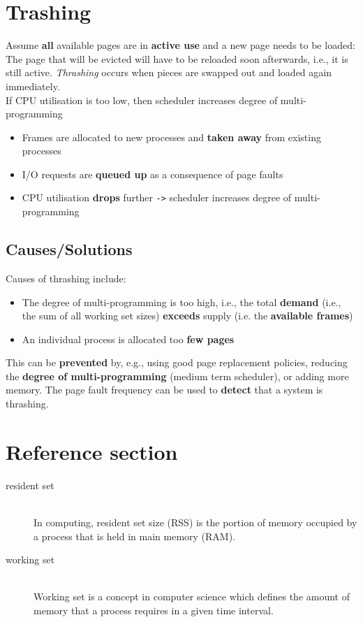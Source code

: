 \documentclass{article}
\begin{document}
\section{Trashing}
\begin{flushleft}
Assume \textbf{all} available pages are in \textbf{active use} and a new page needs to be loaded: The page that will be evicted will have to be reloaded soon afterwards, i.e., it is still active. \textit{Thrashing} occurs when pieces are swapped out and loaded again immediately.\\
If CPU utilisation is too low, then scheduler increases degree of multi-programming
\begin{itemize}
	\item Frames are allocated to new processes and \textbf{taken away} from existing processes
	\item I/O requests are \textbf{queued up} as a consequence of page faults
	\item CPU utilisation \textbf{drops} further \verb!->! scheduler increases degree of multi-programming
\end{itemize}
\end{flushleft}

\subsection{Causes/Solutions}
\begin{flushleft}
Causes of thrashing include:
\begin{itemize}
	\item The degree of multi-programming is too high, i.e., the total \textbf{demand} (i.e., the sum of all working set sizes) \textbf{exceeds} supply (i.e. the \textbf{available frames})
	\item An individual process is allocated too \textbf{few pages}
\end{itemize}
This can be \textbf{prevented} by, e.g., using good page replacement policies, reducing the \textbf{degree of multi-programming} (medium term scheduler), or adding more memory. The page fault frequency can be used to \textbf{detect} that a system is thrashing.
\end{flushleft}

\pagebreak
\section*{Reference section} \label{sec:reference}
\begin{description}
	\item[resident set] \hfill \\ In computing, resident set size (RSS) is the portion of memory occupied by a process that is held in main memory (RAM).
	\item [working set] \hfill \\ Working set is a concept in computer science which defines the amount of memory that a process requires in a given time interval.
\end{description}
\end{document}
